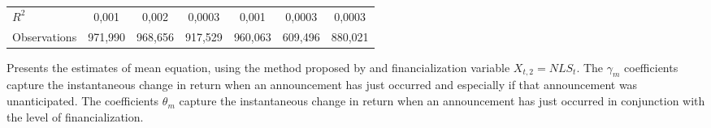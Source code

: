 \begin{landscape}
\begin{table}[]
{\begin{tabular}{lllllllllllll}
$R^2$ &
  \multicolumn{2}{c}{0,001} &
  \multicolumn{2}{c}{0,002} &
  \multicolumn{2}{c}{0,0003} &
  \multicolumn{2}{c}{0,001} &
  \multicolumn{2}{c}{0,0003} &
  \multicolumn{2}{c}{0,0003} \\
Observations &
  \multicolumn{2}{c}{971,990} &
  \multicolumn{2}{c}{968,656} &
  \multicolumn{2}{c}{917,529} &
  \multicolumn{2}{c}{960,063} &
  \multicolumn{2}{c}{609,496} &
  \multicolumn{2}{c}{880,021} \\ \hline
\end{tabular}%
}
\singlespacing
        \footnotesize
 Presents the estimates of mean equation, using the method proposed by \citep{kurov2019price} and financialization variable $X_{t,2}=NLS_t$. The $\gamma_m$ coefficients capture the instantaneous change in return when an announcement has just occurred and especially if that announcement was unanticipated. The coefficients $\theta_m$ capture the instantaneous change in return when an announcement has just occurred in conjunction with the level of financialization.
\end{table}
\end{landscape}


